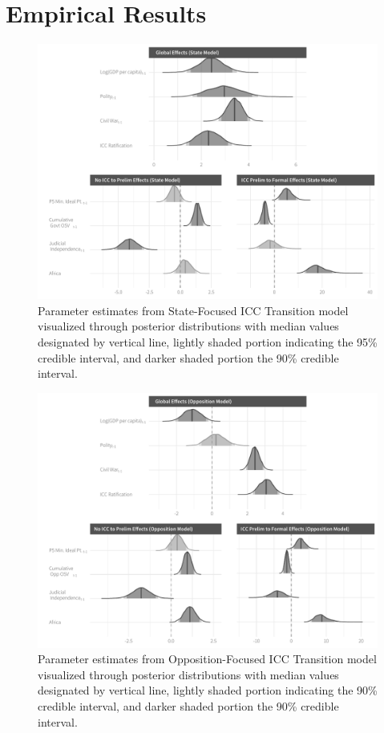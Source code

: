 \section*{Empirical Results}

\begin{figure}
    \centering
    \includegraphics[width=1\textwidth]{stateCoefSumm.pdf}
    \caption{Parameter estimates from State-Focused ICC Transition model visualized through posterior distributions with median values designated by vertical line, lightly shaded portion indicating the 95\% credible interval, and darker shaded portion the 90\% credible interval.}
    \label{fig:stateModel}
\end{figure}

\begin{figure}
    \centering
    \includegraphics[width=1\textwidth]{rebelCoefSumm.pdf}
    \caption{Parameter estimates from Opposition-Focused ICC Transition model visualized through posterior distributions with median values designated by vertical line, lightly shaded portion indicating the 90\% credible interval, and darker shaded portion the 90\% credible interval.}
    \label{fig:rebelModel}
\end{figure}

